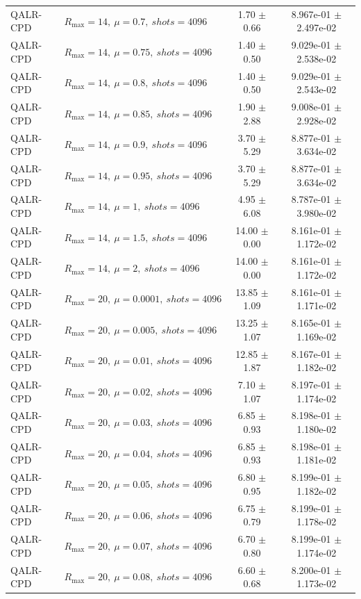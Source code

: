 \begin{table}[t]
\begin{tabular}{@{}llcc@{}}
QALR-CPD & \(R_{\max}=14,\ \mu=0.7,\ shots=4096\) & 1.70 $\pm$ 0.66 & 8.967e-01 $\pm$ 2.497e-02 \\
QALR-CPD & \(R_{\max}=14,\ \mu=0.75,\ shots=4096\) & 1.40 $\pm$ 0.50 & 9.029e-01 $\pm$ 2.538e-02 \\
QALR-CPD & \(R_{\max}=14,\ \mu=0.8,\ shots=4096\) & 1.40 $\pm$ 0.50 & 9.029e-01 $\pm$ 2.543e-02 \\
QALR-CPD & \(R_{\max}=14,\ \mu=0.85,\ shots=4096\) & 1.90 $\pm$ 2.88 & 9.008e-01 $\pm$ 2.928e-02 \\
QALR-CPD & \(R_{\max}=14,\ \mu=0.9,\ shots=4096\) & 3.70 $\pm$ 5.29 & 8.877e-01 $\pm$ 3.634e-02 \\
QALR-CPD & \(R_{\max}=14,\ \mu=0.95,\ shots=4096\) & 3.70 $\pm$ 5.29 & 8.877e-01 $\pm$ 3.634e-02 \\
QALR-CPD & \(R_{\max}=14,\ \mu=1,\ shots=4096\) & 4.95 $\pm$ 6.08 & 8.787e-01 $\pm$ 3.980e-02 \\
QALR-CPD & \(R_{\max}=14,\ \mu=1.5,\ shots=4096\) & 14.00 $\pm$ 0.00 & 8.161e-01 $\pm$ 1.172e-02 \\
QALR-CPD & \(R_{\max}=14,\ \mu=2,\ shots=4096\) & 14.00 $\pm$ 0.00 & 8.161e-01 $\pm$ 1.172e-02 \\
QALR-CPD & \(R_{\max}=20,\ \mu=0.0001,\ shots=4096\) & 13.85 $\pm$ 1.09 & 8.161e-01 $\pm$ 1.171e-02 \\
QALR-CPD & \(R_{\max}=20,\ \mu=0.005,\ shots=4096\) & 13.25 $\pm$ 1.07 & 8.165e-01 $\pm$ 1.169e-02 \\
QALR-CPD & \(R_{\max}=20,\ \mu=0.01,\ shots=4096\) & 12.85 $\pm$ 1.87 & 8.167e-01 $\pm$ 1.182e-02 \\
QALR-CPD & \(R_{\max}=20,\ \mu=0.02,\ shots=4096\) & 7.10 $\pm$ 1.07 & 8.197e-01 $\pm$ 1.174e-02 \\
QALR-CPD & \(R_{\max}=20,\ \mu=0.03,\ shots=4096\) & 6.85 $\pm$ 0.93 & 8.198e-01 $\pm$ 1.180e-02 \\
QALR-CPD & \(R_{\max}=20,\ \mu=0.04,\ shots=4096\) & 6.85 $\pm$ 0.93 & 8.198e-01 $\pm$ 1.181e-02 \\
QALR-CPD & \(R_{\max}=20,\ \mu=0.05,\ shots=4096\) & 6.80 $\pm$ 0.95 & 8.199e-01 $\pm$ 1.182e-02 \\
QALR-CPD & \(R_{\max}=20,\ \mu=0.06,\ shots=4096\) & 6.75 $\pm$ 0.79 & 8.199e-01 $\pm$ 1.178e-02 \\
QALR-CPD & \(R_{\max}=20,\ \mu=0.07,\ shots=4096\) & 6.70 $\pm$ 0.80 & 8.199e-01 $\pm$ 1.174e-02 \\
QALR-CPD & \(R_{\max}=20,\ \mu=0.08,\ shots=4096\) & 6.60 $\pm$ 0.68 & 8.200e-01 $\pm$ 1.173e-02 \\

\end{tabular}
\end{table}
